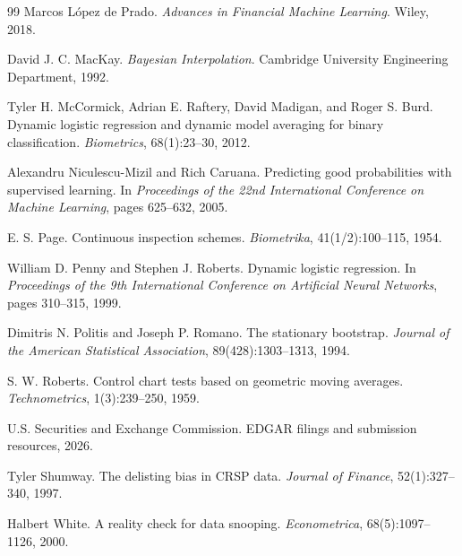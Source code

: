 \documentclass[11pt]{article}
\begin{document}
\begin{thebibliography}{99}
Marcos L{\'o}pez de Prado.
\newblock \emph{Advances in Financial Machine Learning}.
\newblock Wiley, 2018.

David J. C. MacKay.
\newblock \emph{Bayesian Interpolation}.
\newblock Cambridge University Engineering Department, 1992.

Tyler H. McCormick, Adrian E. Raftery, David Madigan, and Roger S. Burd.
\newblock Dynamic logistic regression and dynamic model averaging for binary classification.
\newblock \emph{Biometrics}, 68(1):23--30, 2012.

Alexandru Niculescu-Mizil and Rich Caruana.
\newblock Predicting good probabilities with supervised learning.
\newblock In \emph{Proceedings of the 22nd International Conference on Machine Learning}, pages 625--632, 2005.

E. S. Page.
\newblock Continuous inspection schemes.
\newblock \emph{Biometrika}, 41(1/2):100--115, 1954.

William D. Penny and Stephen J. Roberts.
\newblock Dynamic logistic regression.
\newblock In \emph{Proceedings of the 9th International Conference on Artificial Neural Networks}, pages 310--315, 1999.

Dimitris N. Politis and Joseph P. Romano.
\newblock The stationary bootstrap.
\newblock \emph{Journal of the American Statistical Association}, 89(428):1303--1313, 1994.

S. W. Roberts.
\newblock Control chart tests based on geometric moving averages.
\newblock \emph{Technometrics}, 1(3):239--250, 1959.

U.S. Securities and Exchange Commission.
\newblock EDGAR filings and submission resources, 2026.

Tyler Shumway.
\newblock The delisting bias in CRSP data.
\newblock \emph{Journal of Finance}, 52(1):327--340, 1997.

Halbert White.
\newblock A reality check for data snooping.
\newblock \emph{Econometrica}, 68(5):1097--1126, 2000.
\end{thebibliography}
\end{document}
